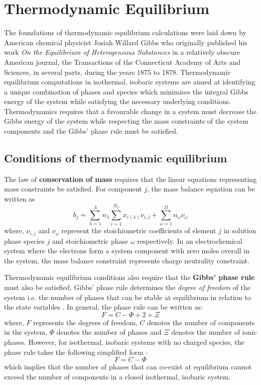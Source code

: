 \section{Thermodynamic Equilibrium}
	The foundations of thermodynamic equilibrium calculations were laid down by American chemical physicist Josiah Willard Gibbs who originally published his work \emph{On the Equilibrium of Heterogeneous Substances} in a relatively obscure American journal, the Transactions of the Connecticut Academy of Arts and Sciences, in several parts, during the years 1875 to 1878. Thermodynamic equilibrium computations in isothermal, isobaric systems are aimed at identifying a unique combination of phases and species which minimises the integral Gibbs energy of the system while satisfying the necessary underlying conditions. Thermodynamics requires that a favourable change in a system must decrease the Gibbs energy of the system while respecting the mass constraints of the system components and the Gibbs' phase rule must be satisfied. 	
	\subsection{Conditions of thermodynamic equilibrium}\label{sec:eqb_theory}
		The law of \textbf{conservation of mass} requires that the linear equations representing mass constraints be satisfied. For component $j$, the mass balance equation can be written as
			\begin{equation}\label{eq:massbalance}
				b_j = \sum_{\lambda=1}^{\Lambda} n_{\lambda}\sum_{i=1}^{N_{\lambda}}x_{i({\lambda})}{\nu}_{i,j} +  \sum_{\omega=1}^{\Omega} n_{\omega}{\nu}_{\omega}
			\end{equation}
			where, ${\nu}_{i,j}$ and ${\nu}_{\omega}$ represent the stoichiometric coefficients of element $j$ in solution phase species $j$ and stoichiometric phase $\omega$ respectively. In an electrochemical system where the electrons form a system component with zero moles overall in the system, the mass balance constraint represents charge neutrality constraint.
			
		Thermodynamic equilibrium conditions also require that the \textbf{Gibbs' phase rule} must also be satisfied. Gibbs' phase rule determines the \emph{degree of freedom} of the system i.e. the number of phases that can be stable at equilibrium in relation to the state variables \cite{Gibbs:1878aa}. In general, the phase rule can be written as: 
			\begin{equation} 
                			F=C-\Phi + 2 + \Xi
            		\end{equation}
            		where, $F$ represents the degrees of freedom, $C$ denotes the number of components in the system, $\Phi$ denotes the number of phases and $\Xi$ denotes the number of ionic phases. However, for isothermal, isobaric systems with no charged species, the phase rule takes the following simplified form :
			\begin{equation}
                			F=C-\Phi
            		\end{equation}
			which implies that the number of phases that can co-exist at equilibrium cannot exceed the number of components in a closed isothermal, isobaric system.
			
